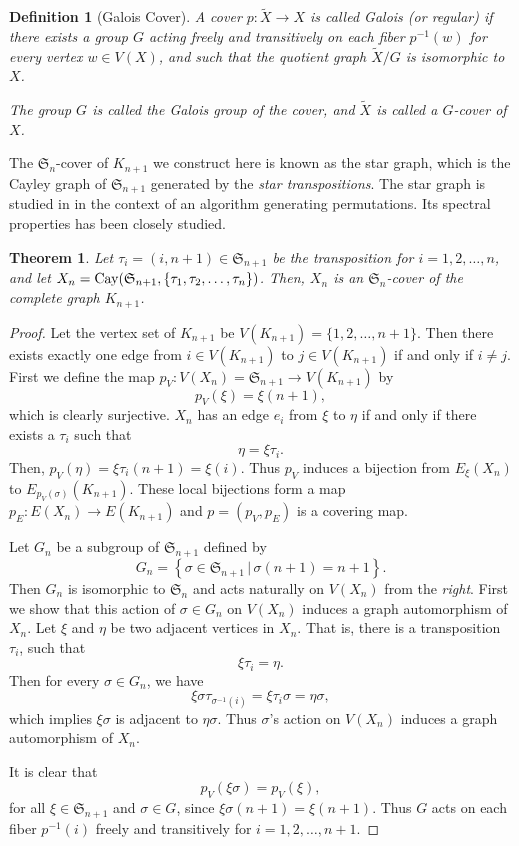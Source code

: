 \documentclass[lualatex,12pt]{article}
\newtheorem{thm}{Theorem}
\newtheorem{definition}{Definition}
\begin{document}
\begin{definition}[Galois Cover]
A cover \(p : \tilde{X} \to X\) is called \emph{Galois} (or \emph{regular}) if there exists a group \(G\) acting freely and transitively on each fiber \(p^{-1}(w)\) for every vertex \(w \in V(X)\),  
and such that the quotient graph \(\tilde{X} / G\) is isomorphic to \(X\).  

The group \(G\) is called the \emph{Galois group} of the cover,
and $\tilde{X}$ is called a \emph{$G$-cover} of $X$.
\end{definition}


The ${\mathfrak S}_n$-cover of $K_{n+1}$ we construct here is known as
the star graph, which is the Cayley graph of ${\mathfrak S}_{n+1}$
generated by the {\em star transpositions}.
The star graph is studied in 
\cite{ehrlich1973loopless} in the context of an algorithm generating
permutations.
Its spectral properties has been closely studied.
\begin{thm}
 \label{thm:main}
 Let $\tau_{i}=(i, n+1)\in {\mathfrak S}_{n+1}$ be the transposition
 for $i=1,2,\ldots,n$, and
 let $X_n={\rm Cay}({\mathfrak S}_{n+1}, \{\tau_1, \tau_2, \ldots, \tau_n\})$.
 Then, $X_n$ is an ${\mathfrak S}_n$-cover of the complete graph $K_{n+1}$.
\end{thm}
\begin{proof}
Let the vertex set of $K_{n+1}$ be $V(K_{n+1})=\{1,2,\ldots,n+1\}$.
Then there exists exactly one edge from $i\in V(K_{n+1})$ to $j\in V(K_{n+1})$
if and only if $i\neq j$.
First we define the map $p_V: V(X_n)={\mathfrak S}_{n+1}\to V(K_{n+1})$ by
\[
 p_V(\xi) = \xi(n+1),
\]
which is clearly surjective.
$X_n$ has an edge $e_i$ from $\xi$ to $\eta$ if and only if there exists
a $\tau_i$ such that
\[
 \eta = \xi\tau_i.
\]
Then, $p_V(\eta)=\xi\tau_i(n+1)=\xi(i)$.
Thus $p_V$ induces a bijection from $E_\xi(X_n)$ to $E_{p_V(\sigma)}(K_{n+1})$.
These local bijections form a map $p_E: E(X_n)\to E(K_{n+1})$ and
$p = (p_V, p_E)$ is a covering map.

Let $G_n$ be a subgroup of ${\mathfrak S}_{n+1}$ defined by
\[
 G_n=\left\{\sigma\in {\mathfrak S}_{n+1}\,|\, \sigma(n+1)=n+1\right\}.
\]
Then $G_n$ is isomorphic to ${\mathfrak S}_n$ and
acts naturally on $V(X_n)$ from the {\em right}. 
First we show that
this action of $\sigma\in G_n$ on $V(X_n)$ induces
a graph automorphism of $X_n$.
Let $\xi$ and $\eta$ be two adjacent vertices in $X_n$.
That is, there is a transposition $\tau_i$, such that
\[
 \xi\tau_i = \eta.
\]
Then for every $\sigma\in G_n$, we have
\[
 \xi\sigma\tau_{\sigma^{-1}(i)} = \xi\tau_{i}\sigma = \eta\sigma,
\]
which implies $\xi\sigma$ is adjacent to $\eta\sigma$.
Thus $\sigma$'s action on $V(X_n)$ induces
a graph automorphism of $X_n$.


It is clear that
\[
 p_V(\xi\sigma) = p_V(\xi),
\]
for all $\xi\in {\mathfrak S}_{n+1}$ and $\sigma\in G$,
since $\xi\sigma(n+1)=\xi(n+1)$. Thus $G$ acts on 
each fiber $p^{-1}(i)$ freely and transitively for $i=1,2,\ldots,n+1$.

\end{proof}
\end{document}
